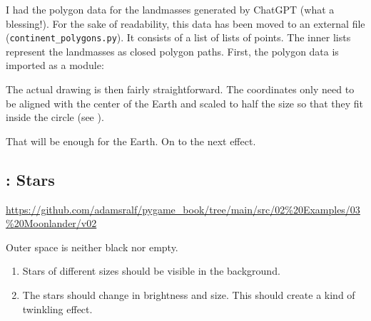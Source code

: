
I had the polygon data for the landmasses generated by ChatGPT (what a blessing!). For the sake of readability, this data has been moved to an external file (\texttt{continent\_poly\-gons.py}). It consists of a list of lists of points. The inner lists represent the landmasses as closed polygon paths. First, the polygon data is imported as a module:


The actual drawing is then fairly straightforward. The coordinates only need to be aligned with the center of the Earth and scaled to half the size so that they fit inside the circle (see ).

\newpage
{}

That will be enough for the Earth. On to the next effect.


\subsection{: Stars}
\begin{diskbox}
	\url{https://github.com/adamsralf/pygame_book/tree/main/src/02%20Examples/03%20Moonlander/v02}
\end{diskbox}

Outer space is neither black nor empty.

\begin{enumerate}
	\item Stars of different sizes should be visible in the background.\label{reqStarsAnzeigen}
	\item The stars should change in brightness and size. This should create a kind of twinkling effect.\label{reqStarsFunkeln}
\end{enumerate}
\er

